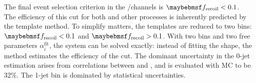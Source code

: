 The final event selection criterion in the \eech/\mmch channels is $\frecoil < 0.1$. The 
efficiency of this cut for both \DYll and other processes is inherently predicted by the 
template method. To simplify matters, the templates are reduced to two bins: 
$\frecoil < 0.1$ and $\frecoil > 0.1$. With two bins and two free parameters 
$\alpha^{\text{fit}}_i$, the system can be solved exactly: instead of fitting the \frecoil 
shape, the method estimates the efficiency of the \frecoil cut. The dominant uncertainty in 
the 0-jet \DYll estimation arises from correlations between \frecoil and \mll, and is 
evaluated with MC to be 32\%. The 1-jet bin is dominated by statistical uncertainties.

